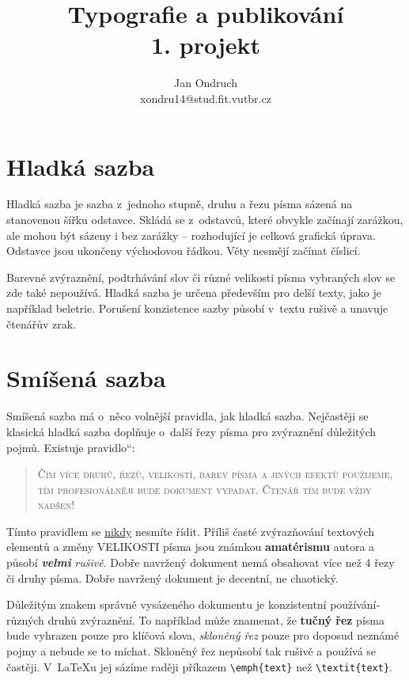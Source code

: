 \documentclass[11pt,a4paper,twocolumn,oneside]{article}
\title{Typografie a publikování\\1. projekt}
\author{Jan Ondruch\\xondru14@stud.fit.vutbr.cz}
\date{}
\providecommand{\uv}[1]{\quotedblbase #1\textquotedblleft}
\begin{document}
	\maketitle
	\section{Hladká sazba}

Hladká sazba je sazba z~jednoho stupně, druhu a řezu pí­sma sázená na stanovenou šířku odstavce. Skládá se z~odstavců, které obvykle začínají­ zarážkou, ale mohou být sázeny i bez zarážky -- rozhodují­cí­ je celková grafická úprava. Odstavce jsou ukončeny východovou řádkou. Věty nesmějí začínat číslicí.

Barevné zvýraznění­, podtrhávání­ slov či různé velikosti písma vybraných slov se zde také nepoužívá. Hladká sazba je určena především pro delší­ texty, jako je napří­klad beletrie. Porušení­ konzistence sazby působí v~textu rušivě a unavuje čtenářův zrak.

	\section{Smíšená sazba}

Smíšená sazba má o~něco volnější­ pravidla, jak hladká sazba. Nejčastěji se klasická hladká sazba doplňuje o~další řezy pí­sma pro zvýraznění­ důležitých pojmů. Existuje \uv{pravidlo}:

	\begin{quotation}
\textsc {Čí­m ví­ce druhů, řezů, velikostí, barev pí­sma a jiných efektů použijeme, tí­m profesionálněji bude  dokument vypadat. Čtenář tím bude vždy nadšen!}
	\end{quotation}

Tí­mto pravidlem se \underline{nikdy} nesmí­te ří­dit. Příliš časté zvýrazňování textových elementů  a změny {\Huge V}{\huge E}{\LARGE L}{\Large I}{\large K}{\normalsize O}{\small S}{\footnotesize T}{\scriptsize I} pí­sma {\large{jsou}} {\LARGE{známkou}} {\huge{\bfseries {amatérismu}}} autora a působí­ {\bfseries {\itshape velmi}} {\itshape rušivě}. Dobře navržený dokument nemá obsahovat ví­ce než 4 řezy či druhy pí­sma. {\ttfamily Dobře navržený dokument je decentní­, ne chaotický.}

Důležitým znakem správně vysázeného dokumentu je konzistentní použí­vání­ různých druhů zvýraznění­. To napří­klad může znamenat, že {\bfseries tučný řez} pí­sma bude vyhrazen pouze pro klíčová slova, {\slshape skloněný řez} pouze pro doposud neznámé pojmy a nebude se to míchat. Skloněný řez nepůsobí­ tak rušivě a používá se častěji. V~\LaTeX u jej sází­me raději pří­kazem \verb|\emph{text}| než \verb|\textit{text}|.
\end{document}
